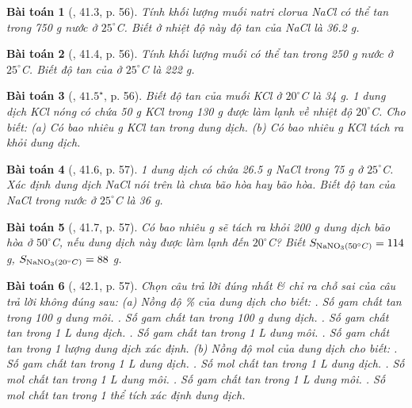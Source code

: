 \documentclass{article}
\newtheorem{baitoan}{Bài toán}
\begin{document}
\begin{baitoan}[\cite{SBT_Hoa_Hoc_8}, 41.3, p. 56]
	Tính khối lượng muối natri clorua \emph{NaCl} có thể tan trong \emph{750 g} nước ở $25^\circ$\emph{C}. Biết ở nhiệt độ này độ tan của \emph{NaCl} là \emph{36.2 g}.
\end{baitoan}

\begin{baitoan}[\cite{SBT_Hoa_Hoc_8}, 41.4, p. 56]
	Tính khối lượng muối \emph{} có thể tan trong \emph{250 g} nước ở $25^\circ$\emph{C}. Biết độ tan của \emph{} ở $25^\circ$\emph{C} là \emph{222 g}.
\end{baitoan}

\begin{baitoan}[\cite{SBT_Hoa_Hoc_8}, $41.5^\star$, p. 56]
	Biết độ tan của muối \emph{KCl} ở 	$20^\circ$\emph{C} là \emph{34 g}. 1 dung dịch \emph{KCl} nóng có chứa \emph{50 g KCl} trong \emph{130 g } được làm lạnh về nhiệt độ $20^\circ$\emph{C}. Cho biết: (a) Có bao nhiêu \emph{g KCl} tan trong dung dịch. (b) Có bao nhiêu \emph{g KCl} tách ra khỏi dung dịch.
\end{baitoan}

\begin{baitoan}[\cite{SBT_Hoa_Hoc_8}, 41.6, p. 57]
	1 dung dịch có chứa \emph{26.5 g NaCl} trong \emph{75 g } ở $25^\circ$\emph{C}. Xác định dung dịch \emph{NaCl} nói trên là chưa bão hòa hay bão hòa. Biết độ tan của \emph{NaCl} trong nước ở $25^\circ$\emph{C} là \emph{36 g}.
\end{baitoan}

\begin{baitoan}[\cite{SBT_Hoa_Hoc_8}, 41.7, p. 57]
	Có bao nhiêu \emph{g } sẽ tách ra khỏi \emph{200 g} dung dịch bão hòa \emph{} ở $50^\circ$\emph{C}, nếu dung dịch này được làm lạnh đến $20^\circ$\emph{C}? Biết \emph{$S_{\ce{NaNO3}(50^\circ C)} = 114$ g, $S_{\ce{NaNO3}(20^\circ C)} = 88$ g}.
\end{baitoan}

\begin{baitoan}[\cite{SBT_Hoa_Hoc_8}, 42.1, p. 57]
	Chọn câu trả lời đúng nhất \& chỉ ra chỗ sai của câu trả lời không đúng sau: (a) Nồng độ \% của dung dịch cho biết: {.} Số gam chất tan trong \emph{100 g} dung môi. {.} Số gam chất tan trong \emph{100 g} dung dịch. {.} Số gam chất tan trong \emph{1 L} dung dịch. {.} Số gam chất tan trong \emph{1 L} dung môi. {.} Số gam chất tan trong 1 lượng dung dịch xác định. (b) Nồng độ mol của dung dịch cho biết: {.} Số gam chất tan trong \emph{1 L} dung dịch. {.} Số mol chất tan trong \emph{1 L} dung dịch. {.} Số mol chất tan trong \emph{1 L} dung môi. {.} Số gam chất tan trong \emph{1 L} dung môi. {.} Số mol chất tan trong 1 thể tích xác định dung dịch.
\end{baitoan}
\end{document}
